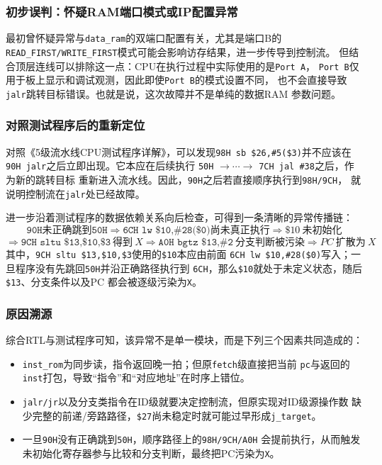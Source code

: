 ﻿\documentclass{article}
\begin{document}
\subsubsection{初步误判：怀疑RAM端口模式或IP配置异常}

最初曾怀疑异常与\texttt{data\_ram}的双端口配置有关，尤其是端口B的
\texttt{READ\_FIRST/WRITE\_FIRST}模式可能会影响访存结果，进一步传导到控制流。
但结合顶层连线可以排除这一点：CPU在执行过程中实际使用的是\texttt{Port A}，
\texttt{Port B}仅用于板上显示和调试观测，因此即使\texttt{Port B}的模式设置不同，
也不会直接导致\texttt{jalr}跳转目标错误。也就是说，这次故障并不是单纯的数据RAM
参数问题。

\subsubsection{对照测试程序后的重新定位}

对照《5级流水线CPU测试程序详解》，可以发现\texttt{98H sb \$26,\#5(\$3)}并不应该在
\texttt{90H jalr}之后立即出现。它本应在后续执行
\texttt{50H} $\rightarrow \cdots \rightarrow$ \texttt{7CH jal \#38}之后，作为新的跳转目标
重新进入流水线。因此，\texttt{90H}之后若直接顺序执行到\texttt{98H/9CH}，
就说明控制流在\texttt{jalr}处已经故障。

进一步沿着测试程序的数据依赖关系向后检查，可得到一条清晰的异常传播链：
\begin{equation}
\texttt{90H}未正确跳到\texttt{50H}
\Rightarrow \texttt{6CH lw \$10,\#28(\$0)}尚未真正执行
\Rightarrow \$10\ \text{未初始化}
\end{equation}
\begin{equation}
\Rightarrow \texttt{9CH sltu \$13,\$10,\$3}\ \text{得到}\ X
\Rightarrow \texttt{A0H bgtz \$13,\#2}\ \text{分支判断被污染}
\Rightarrow PC\ \text{扩散为}\ X
\end{equation}
其中，\texttt{9CH sltu \$13,\$10,\$3}使用的\texttt{\$10}本应由前面
\texttt{6CH lw \$10,\#28(\$0)}写入；一旦程序没有先跳回\texttt{50H}并沿正确路径执行到
\texttt{6CH}，那么\texttt{\$10}就处于未定义状态，随后\texttt{\$13}、分支条件以及PC
都会被逐级污染为\texttt{X}。

\subsubsection{原因溯源}

综合RTL与测试程序可知，该异常不是单一模块，而是下列三个因素共同造成的：
\begin{itemize}
  \item \texttt{inst\_rom}为同步读，指令返回晚一拍；但原\texttt{fetch}级直接把当前
  \texttt{pc}与返回的\texttt{inst}打包，导致“指令”和“对应地址”在时序上错位。
  \item \texttt{jalr/jr}以及分支类指令在ID级就要决定控制流，但原实现对ID级源操作数
  缺少完整的前递/旁路路径，\texttt{\$27}尚未稳定时就可能过早形成\texttt{j\_target}。
  \item 一旦\texttt{90H}没有正确跳到\texttt{50H}，顺序路径上的\texttt{98H/9CH/A0H}
  会提前执行，从而触发未初始化寄存器参与比较和分支判断，最终把PC污染为\texttt{X}。
\end{itemize}
\end{document}

